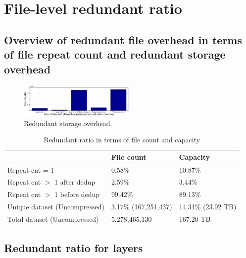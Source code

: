 \section{File-level redundant ratio}
\label{sec:dedup}

\subsection{Overview of redundant file overhead in terms of file repeat count and redundant storage overhead}

\begin{figure}
	\centering
	\includegraphics[width=0.5\textwidth]{graphs/capacity_data_ratio.eps}
	\caption{Redundant storage overhead.
	}
	\label{fig_redundant_overhead}
\end{figure}

\begin{table} 
	\centering 
	\scriptsize  
	\caption{Redundant ratio in terms of file count and capacity} \label{tbl:redundant_ratio} 
	\begin{tabular}{|l|l|l|}%
		\hline 
		       & File count & Capacity \\
		\hline
		Repeat cnt = 1 & 0.58\% & 10.87\%\\
		\hline
		Repeat cnt $>$ 1 after dedup & 2.59\% & 3.44\%\\
		\hline
		Repeat cnt $>$ 1 before dedup  & 99.42\%  & 89.13\%\\
		\hline
		Unique dataset (Uncompressed) & 3.17\% (167,251,437)  &  14.31\% (23.92 TB) \\
		\hline 
		Total dataset (Uncompressed) & 5,278,465,130 & 167.20 TB \\
		\hline 	
	\end{tabular} 
\end{table} 

\subsection{Redundant ratio for layers}

